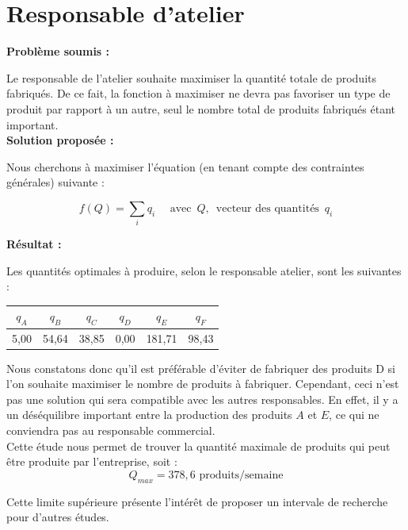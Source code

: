 \documentclass[paper=a4, fontsize=11pt]{report}
\numberwithin{equation}{section}		%
\numberwithin{figure}{section}			%
\numberwithin{table}{section}				%
\renewcommand{\bf}[1]{\textbf{#1}}
\begin{document}

\section{Responsable d'atelier}
\bf{Problème soumis :}

Le responsable de l'atelier souhaite maximiser la quantité totale de produits fabriqués. De ce fait, la fonction à maximiser ne devra pas favoriser un type de produit par rapport à un autre, seul le nombre total de produits fabriqués étant important.\\

\bf{Solution proposée :}

Nous cherchons à maximiser l'équation (en tenant compte des contraintes générales) suivante :

\[f(Q) = \sum_i q_i \quad \text{  avec } \, Q, \, \text{ vecteur des quantités } \, q_i \]

\bf{Résultat :}

Les quantités optimales à produire, selon le responsable atelier, sont les suivantes :

\begin{center}
\begin{tabular}{cccccc}
\hline 
$q_A$ & $q_B$ & $q_C$ & $q_D$ & $q_E$ & $q_F$ \\ 
\hline 
5,00 & 54,64 & 38,85 & 0,00 & 181,71 & 98,43 \\ 
\hline 
\end{tabular} 
\end{center}

Nous constatons donc qu'il est préférable d'éviter de fabriquer des produits D si l'on souhaite maximiser le nombre de produits à fabriquer. Cependant, ceci n'est pas une solution qui sera compatible avec les autres responsables. En effet, il y a un déséquilibre important entre la production des produits $A$ et $E$, ce qui ne conviendra pas au responsable commercial.\\

Cette étude nous permet de trouver la quantité maximale de produits qui peut être produite par l'entreprise, soit :
\[ Q_{max} = 378,6 \text{ produits/semaine}\]

Cette limite supérieure présente l'intérêt de proposer un intervale de recherche pour d'autres études.


\end{document}

